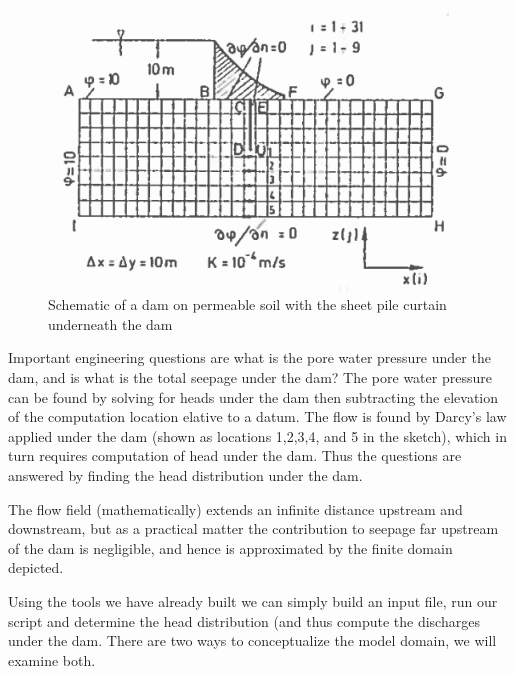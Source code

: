 \begin{figure}[h!] %
   \centering
   \includegraphics[width=5.2in]{./17-SteadyGroundwaterFlow/DamSeepage.jpg} 
   \caption{Schematic of a dam on permeable soil with the sheet pile curtain underneath the dam}
   \label{fig:DamSeepage}
\end{figure}
Important engineering questions are what is the pore water pressure under the dam, and is what is the total seepage under the dam?
The pore water pressure can be found by solving for heads under the dam then subtracting the elevation of the computation location elative to a datum.   
The flow is found by Darcy's law applied under the dam (shown as locations 1,2,3,4, and 5 in the sketch), which in turn requires computation of head under the dam.  
Thus the questions are answered by finding the head distribution under the dam.

The flow field (mathematically) extends an infinite distance upstream and downstream, but as a practical matter the contribution to seepage far upstream of the dam is negligible, and hence is approximated by the finite domain depicted.  

Using the tools we have already built we can simply build an input file, run our script and determine the head distribution (and thus compute the discharges under the dam.   There are two ways to conceptualize the model domain, we will examine both.  

